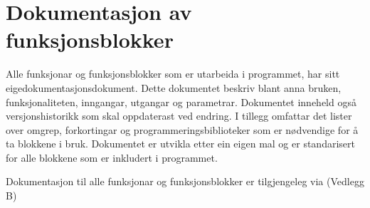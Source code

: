 \section{Dokumentasjon av funksjonsblokker}
\thispagestyle{fancy}

Alle funksjonar og funksjonsblokker som er utarbeida i programmet, har sitt eige\newline dokumentasjonsdokument.
Dette dokumentet beskriv blant anna bruken, funksjonaliteten, inngangar, utgangar og parametrar.
Dokumentet inneheld også versjonshistorikk som skal oppdaterast ved endring. I tillegg omfattar det lister over omgrep, forkortingar og 
programmeringsbiblioteker som er nødvendige for å ta blokkene i bruk.
Dokumentet er utvikla etter ein eigen mal og er standarisert for alle blokkene som er inkludert i programmet.

Dokumentasjon til alle funksjonar og funksjonsblokker er tilgjengeleg via (Vedlegg B)